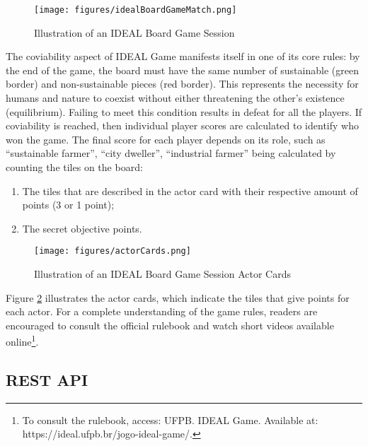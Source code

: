 \documentclass[english]{sbc2025}
\begin{document}
\begin{figure}[h]
  \centering
  \texttt{[image: figures/idealBoardGameMatch.png]}
  \caption{Illustration of an IDEAL Board Game Session}
  \label{fig_boardGameSession}
\end{figure}

The coviability aspect of IDEAL Game manifests itself in one of its core rules: by the end of the game, the board must have the same number of sustainable (green border) and non-sustainable pieces (red border). This represents the necessity for humans and nature to coexist without either threatening the other’s existence (equilibrium).  Failing to meet this condition results in defeat for all the players. If coviability is reached, then individual player scores are calculated to identify who won the game. The final score for each player depends on its role, such as “sustainable farmer”, “city dweller”, “industrial farmer” being calculated by counting the tiles on the board: 

\begin{enumerate}
    \item The tiles that are described in the actor card with their respective amount of points (3 or 1 point);
    \item The secret objective points.
\end{enumerate}

\begin{figure}[h]
  \centering
  \texttt{[image: figures/actorCards.png]}
  \caption{Illustration of an IDEAL Board Game Session Actor Cards}
  \label{fig_actorCards}
\end{figure}

Figure \ref{fig_actorCards} illustrates the actor cards, which indicate the tiles that give points for each actor. For a complete understanding of the game rules, readers are encouraged to consult the official rulebook and watch short videos available online\footnote{To consult the rulebook, access: UFPB. IDEAL Game. Available at: https://ideal.ufpb.br/jogo-ideal-game/.}.


\subsection{REST API}
\end{document}
